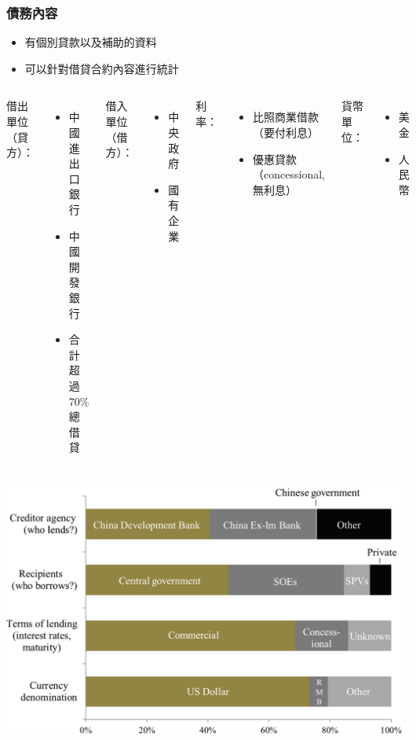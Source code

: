 \begin{frame}
    \frametitle{債務內容}

    \begin{itemize}
        \item \citet*{Horn-Reinhart-Trebesch-21} 有個別貸款以及補助的資料
        \item 可以針對借貸合約內容進行統計
    \end{itemize}

    \vfill
    \begin{columns}
        借出單位（貸方）：
        \begin{itemize}
            \item 中國進出口銀行
            \item 中國開發銀行
            \item 合計超過 70\% 總借貸
        \end{itemize}
        借入單位（借方）：
        \begin{itemize}
            \item 中央政府
            \item 國有企業
        \end{itemize}
        利率：
        \begin{itemize}
            \item 比照商業借款（要付利息）
            \item 優惠貸款（concessional,無利息）
        \end{itemize}
        貨幣單位：
        \begin{itemize}
            \item 美金
            \item 人民幣
        \end{itemize}
    \end{columns}

\end{frame}

\begin{frame}

    \includegraphics[width = \textwidth]{fig/fig10.jpg}

\end{frame}